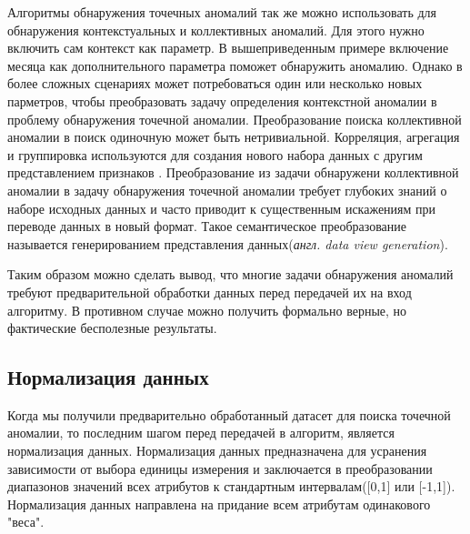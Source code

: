 Алгоритмы обнаружения точечных аномалий так же можно использовать для обнаружения контекстуальных и коллективных аномалий. Для этого нужно включить сам контекст как параметр. В вышеприведенным примере включение месяца как дополнительного параметра поможет обнаружить аномалию. Однако в более сложных сценариях может потребоваться один или несколько новых парметров, чтобы преобразовать задачу определения контекстной аномалии в проблему обнаружения точечной аномалии. Преобразование поиска коллективной аномалии в поиск одиночную может быть нетривиальной. Корреляция, агрегация и группировка используются  для создания нового набора данных с другим представлением признаков\cite{Book05} . Преобразование из задачи обнаружени коллективной аномалии в задачу обнаружения точечной аномалии требует глубоких знаний о наборе исходных данных и часто приводит  к существенным искажениям при переводе данных в новый формат. Такое семантическое преобразование называется  генерированием представления данных(\textit{англ. data view generation}).
  
  Таким образом можно сделать вывод, что многие задачи обнаружения аномалий требуют предварительной обработки данных перед передачей их на вход алгоритму. В противном случае можно получить формально верные, но фактические бесполезные результаты.
\subsection{Нормализация данных} 
Когда мы получили предварительно обработанный  датасет для поиска точечной аномалии, то последним шагом перед передачей в алгоритм, является нормализация данных. Нормализация данных предназначена для усранения зависимости от выбора единицы измерения и заключается в преобразовании диапазонов значений всех атрибутов к стандартным интервалам([0,1] или [-1,1])\cite{Book06}. Нормализация данных направлена на придание всем атрибутам одинакового "веса".
